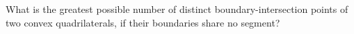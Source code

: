 What is the greatest possible number of distinct boundary-intersection points of two convex quadrilaterals, if their boundaries share no segment?

